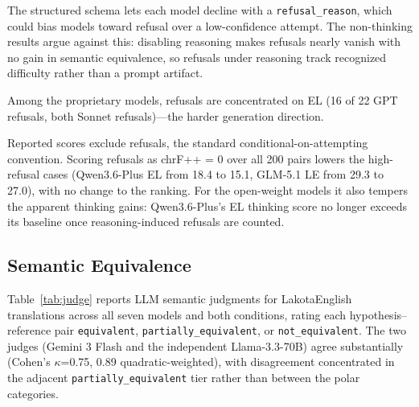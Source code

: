 \documentclass[11pt]{article}
\begin{document}
The structured schema lets each model decline with a \texttt{refusal\_reason}, which could bias models toward refusal over a low-confidence attempt. The non-thinking results argue against this: disabling reasoning makes refusals nearly vanish with no gain in semantic equivalence, so refusals under reasoning track recognized difficulty rather than a prompt artifact.

Among the proprietary models, refusals are concentrated on E\textrightarrow L (16 of 22 GPT refusals, both Sonnet refusals)---the harder generation direction.

Reported scores exclude refusals, the standard conditional-on-attempting convention. Scoring refusals as chrF++ = 0 over all 200 pairs lowers the high-refusal cases (Qwen3.6-Plus E\textrightarrow L from 18.4 to 15.1, GLM-5.1 L\textrightarrow E from 29.3 to 27.0), with no change to the ranking. For the open-weight models it also tempers the apparent thinking gains: Qwen3.6-Plus's E\textrightarrow L thinking score no longer exceeds its baseline once reasoning-induced refusals are counted.

\subsection{Semantic Equivalence}
\label{sec:semantic}

Table~\ref{tab:judge} reports LLM semantic judgments for Lakota\textrightarrow English translations across all seven models and both conditions, rating each hypothesis--reference pair \texttt{equivalent}, \texttt{partially\_equivalent}, or \texttt{not\_equivalent}. The two judges (Gemini 3 Flash and the independent Llama-3.3-70B) agree substantially (Cohen's $\kappa$=0.75, 0.89 quadratic-weighted), with disagreement concentrated in the adjacent \texttt{partially\_equivalent} tier rather than between the polar categories.
\end{document}
